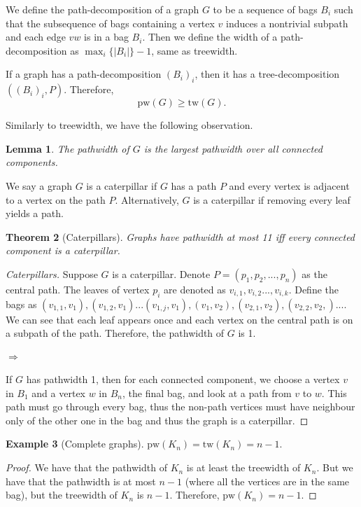 \documentclass[]{report}
\newcommand{\tw}{\text{tw}}
\newcommand{\pw}{\text{pw}}
\newtheorem{theorem}{Theorem}
\newtheorem{lemma}[theorem]{Lemma}
\theoremstyle{definition}
\newtheorem{example}[theorem]{Example}
\numberwithin{theorem}{section}
\numberwithin{equation}{section}
\begin{document}
We define the path-decomposition of a graph $G$ to be a sequence of bags $B_i$ such that the subsequence of bags containing a vertex $v$ induces a nontrivial subpath and each edge $vw$ is in a bag $B_i$. Then we define the width of a path-decomposition as $\max_i \lbrace |B_i| \rbrace -1$, same as treewidth.

If a graph has a path-decomposition $(B_i)_i$, then it has a tree-decomposition $\left((B_i)_i, P\right)$. Therefore,
\begin{equation}
	\pw(G) \geq \tw(G).
\end{equation}

Similarly to treewidth, we have the following observation.
\begin{lemma}
	The pathwidth of $G$ is the largest pathwidth over all connected components.
\end{lemma}
We say a graph $G$ is a caterpillar if $G$ has a path $P$ and every vertex is adjacent to a vertex on the path $P$. Alternatively, $G$ is a caterpillar if removing every leaf yields a path.
\begin{theorem}[Caterpillars]
	Graphs have pathwidth at most 11 iff every connected component is a caterpillar. 
\end{theorem}
\begin{proof}[Caterpillars]
	Suppose $G$ is a caterpillar. Denote $P =\left( p_1, p_2, ..., p_n\right)$ as the central path. The leaves of vertex $p_i$ are denoted as $v_{i, 1}, v_{i, 2} ..., v_{i, k}$. Define the bags as $(v_{1, 1}, v_1), (v_{1, 2}, v_1)... (v_{1, j}, v_1), (v_1, v_2), (v_{2, 1}, v_2), (v_{2,2}, v_2,)... $. We can see that each leaf appears once and each vertex on the central path is on a subpath of the path. Therefore, the pathwidth of $G$ is 1.
	\paragraph{$\Rightarrow$}
	If $G$ has pathwidth 1, then for each connected component, we choose a vertex $v$ in $B_1$ and a vertex $w$ in $B_n$, the final bag, and look at a path from $v$ to $w$. This path must go through every bag, thus the non-path vertices must have neighbour only of the other one in the bag and thus the graph is a caterpillar. 
\end{proof}
\begin{example}[Complete graphs]
	$\pw(K_n) = \tw(K_n) = n - 1$. 
\end{example}
\begin{proof}
	We have that the pathwidth of $K_n$ is at least the treewidth of $K_n$. But we have that the pathwidth is at most $n- 1$ (where all the vertices are in the same bag), but the treewidth of $K_n$ is $n - 1$. Therefore, $\pw(K_n) = n - 1$. 
\end{proof}
\end{document}
